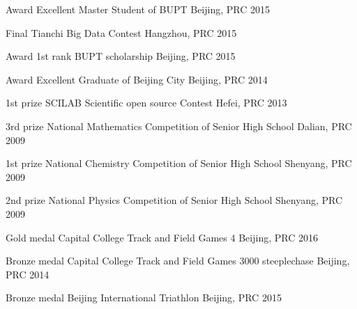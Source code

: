\begin{cvhonors}
\cvhonor
{Award} %
{Excellent Master Student of BUPT} %
{Beijing, PRC} %
{2015} %


\cvhonor
{Final} %
{Tianchi Big Data Contest} %
{Hangzhou, PRC} %
{2015} %






\cvhonor
{Award} %
{1st rank BUPT scholarship} %
{Beijing, PRC} %
{2015} %


\cvhonor
{Award} %
{Excellent Graduate of Beijing City} %
{Beijing, PRC} %
{2014} %



\cvhonor
{1st prize} %
{SCILAB Scientific open source Contest} %
{Hefei, PRC} %
{2013} %


\cvhonor
{3rd prize} %
{National Mathematics Competition of Senior High School} %
{Dalian, PRC} %
{2009} %

\cvhonor
{1st prize} %
{National Chemistry Competition of Senior High School} %
{Shenyang, PRC} %
{2009} %

\cvhonor
{2nd prize} %
{National Physics Competition of Senior High School} %
{Shenyang, PRC} %
{2009} %

\cvhonor
{Gold medal} %
{Capital College Track and Field Games 4} %
{Beijing, PRC} %
{2016} %

\cvhonor
{Bronze medal} %
{Capital College Track and Field Games 3000 steeplechase} %
{Beijing, PRC} %
{2014} %

\cvhonor
{Bronze medal} %
{Beijing International Triathlon} %
{Beijing, PRC} %
{2015} %


\end{cvhonors}
